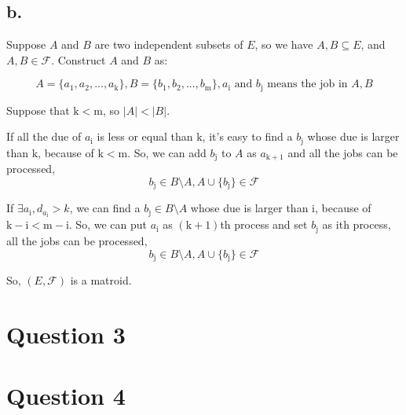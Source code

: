 \documentclass{article}
\begin{document}
{    \subsection*{b.}{
        Suppose \(\mathit{A}\) and \(\mathit{B}\) are two independent subsets of \(\mathit{E}\), so we have \(\mathit{A}, \mathit{B} \subseteq \mathit{E}\), and \(\mathit{A}, \mathit{B} \in \mathcal{F}\). Construct \(\mathit{A}\) and \(\mathit{B}\) as:

        \[\mathit{A}=\{ \mathit{a}_{\mathrm{1}}, \mathit{a}_{\mathrm{2}}, ..., \mathit{a}_{\mathrm{k}}\}, \mathit{B}=\{ \mathit{b}_{\mathrm{1}}, \mathit{b}_{\mathrm{2}}, ..., \mathit{b}_{\mathrm{m}}\}, \mathit{a}_{\mathrm{i}} \text{ and } \mathit{b}_{\mathrm{j}} \text{ means the job in }\mathit{A}, \mathit{B}\]

        Suppose that \(\mathrm{k} < \mathrm{m}\), so \(\lvert \mathit{A} \rvert < \lvert \mathit{B} \rvert\).

        If all the due of \(\mathit{a}_{\mathrm{i}}\) is less or equal than \(\mathrm{k}\), it's easy to find a \(\mathit{b}_{\mathrm{j}}\) whose due is larger than \(\mathrm{k}\), because of \(\mathrm{k} < \mathrm{m}\). So, we can add \(\mathit{b}_{\mathrm{j}}\) to \(\mathit{A}\) as \(\mathit{a}_{\mathrm{k+1}}\) and all the jobs can be processed, 
        \[\mathit{b}_{\mathrm{j}} \in \mathit{B} \setminus \mathit{A}, \mathit{A} \cup \{ \mathit{b}_{\mathrm{j}} \} \in \mathcal{F}\]

        If \(\exists \mathit{a}_{\mathrm{i}}, \mathit{d}_{\mathit{a}_{\mathrm{i}}}>k\), we can find a \(\mathit{b}_{\mathrm{j}} \in \mathit{B} \setminus \mathit{A}\) whose due is larger than \(\mathrm{i}\), because of \(\mathrm{k-i} < \mathrm{m-i}\). So, we can put \(\mathit{a}_{\mathrm{i}}\) as \((\mathrm{k+1})\)th process and set \(\mathit{b}_{\mathrm{j}}\) as \(\mathrm{i}\)th process, all the jobs can be processed,
        \[\mathit{b}_{\mathrm{j}} \in \mathit{B} \setminus \mathit{A}, \mathit{A} \cup \{ \mathit{b}_{\mathrm{j}} \} \in \mathcal{F}\]

        So, \((\mathit{E},\mathcal{F})\) is a matroid.
    }
}

\section*{Question 3}{

}

\section*{Question 4}{

}
\end{document}
